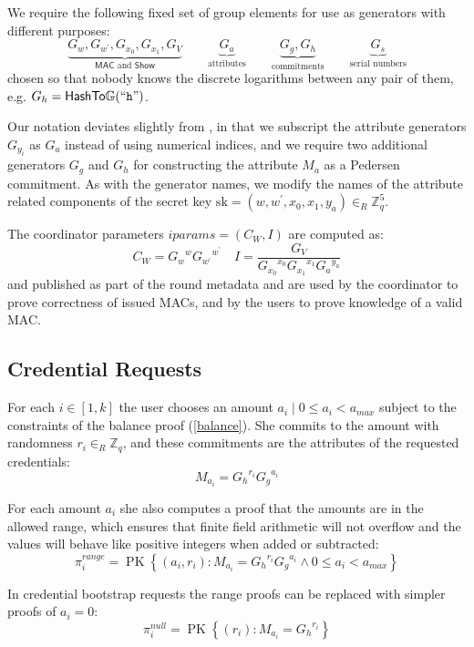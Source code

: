 \documentclass[a4paper]{article}
\begin{document}
We require the following fixed set of group elements for use as generators with different purposes:
\[
\underbrace{G_{w}, G_{w^{\prime}}, G_{x_{0}}, G_{x_{1}}, G_{V}}_{\mathsf{MAC} \text{~and~} \mathsf{Show}}
\qquad
\underbrace{G_a}_{\text{attributes}}
\qquad
\underbrace{G_g, G_h}_{\text{commitments}}
\qquad
\underbrace{G_s}_{\text{serial numbers}}
\]
chosen so that nobody knows the discrete logarithms between any pair of them, e.g. $G_h = \mathsf{HashTo\mathbb{G}}(``\texttt{h}")$.

Our notation deviates slightly from \cite{chase2019signal}, in that we subscript the attribute generators $G_{y_i}$ as $G_a$ instead of using numerical indices, and we require two additional generators $G_g$ and $G_h$ for constructing the attribute $M_a$ as a Pedersen commitment. As with the generator names, we modify the names of the attribute related components of the secret key
$\mathrm{sk} = (w, w^{\prime}, x_{0}, x_{1}, y_{a}) \in_R {\mathbb{Z}^5_q}$.

The coordinator parameters
$\mathit{iparams} =  (C_{W}, I)$
are computed as:
\[
C_{W}={G_w}^{w} {G_{w^\prime}}^{w^\prime}
\quad
I=\frac{G_{V}}{{G_{x_0}}^{x_0} {G_{x_1}}^{x_1} {G_a}^{y_a} }
\]
and published as part of the round metadata and are used by the coordinator to prove correctness of issued MACs, and by the users to prove knowledge of a valid MAC.

\subsection{Credential Requests}

For each $i \in [1, k]$ the user chooses an amount $a_i \mid 0 \leq a_i < a_{\mathit{max}}$ subject to the constraints of the balance proof (\cref{balance}). She commits to the amount with randomness $r_i \in_R \mathbb{Z}_q$, and these commitments are the attributes of the requested credentials:
\[ M_{a_i}={G_h}^{r_i}{G_g}^{a_i} \]

For each amount $a_i$ she also computes a proof that the amounts are in the allowed range, which ensures that finite field arithmetic will not overflow and the values will behave like positive integers when added or subtracted:
\[
\pi^{\mathit{range}}_i = \operatorname{PK}\left\{\left(a_i, r_i \right) :
M_{a_i} = {G_h}^{r_i}{G_g}^{a_i}
\land
0 \leq a_i < a_{\mathit{max}} \right\}
\]

In credential bootstrap requests the range proofs can be replaced with simpler proofs of $a_i = 0$:
\[
  \pi^{\mathit{null}}_i = \operatorname{PK}\left\{ \left( r_i\right) :
    M_{a_i} = {G_{h}}^{r_i}
  \right\}
\]
\end{document}
